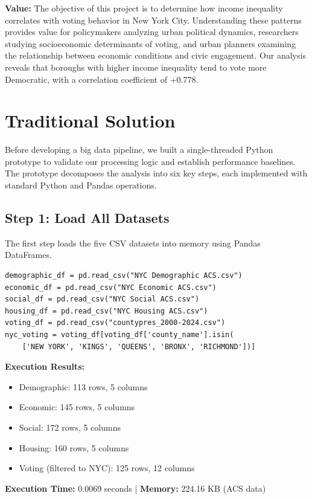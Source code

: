 \documentclass[11pt,a4paper]{article}
\begin{document}
\textbf{Value:} The objective of this project is to determine how income inequality correlates with voting behavior in New York City. Understanding these patterns provides value for policymakers analyzing urban political dynamics, researchers studying socioeconomic determinants of voting, and urban planners examining the relationship between economic conditions and civic engagement. Our analysis reveals that boroughs with higher income inequality tend to vote more Democratic, with a correlation coefficient of +0.778.

\section{Traditional Solution}

Before developing a big data pipeline, we built a single-threaded Python prototype to validate our processing logic and establish performance baselines. The prototype decomposes the analysis into six key steps, each implemented with standard Python and Pandas operations.

\subsection{Step 1: Load All Datasets}

The first step loads the five CSV datasets into memory using Pandas DataFrames.

\begin{verbatim}
demographic_df = pd.read_csv("NYC Demographic ACS.csv")
economic_df = pd.read_csv("NYC Economic ACS.csv")
social_df = pd.read_csv("NYC Social ACS.csv")
housing_df = pd.read_csv("NYC Housing ACS.csv")
voting_df = pd.read_csv("countypres_2000-2024.csv")
nyc_voting = voting_df[voting_df['county_name'].isin(
    ['NEW YORK', 'KINGS', 'QUEENS', 'BRONX', 'RICHMOND'])]
\end{verbatim}

\textbf{Execution Results:}
\begin{itemize}
    \item Demographic: 113 rows, 5 columns
    \item Economic: 145 rows, 5 columns
    \item Social: 172 rows, 5 columns
    \item Housing: 160 rows, 5 columns
    \item Voting (filtered to NYC): 125 rows, 12 columns
\end{itemize}
\textbf{Execution Time:} 0.0069 seconds | \textbf{Memory:} 224.16 KB (ACS data)
\end{document}
